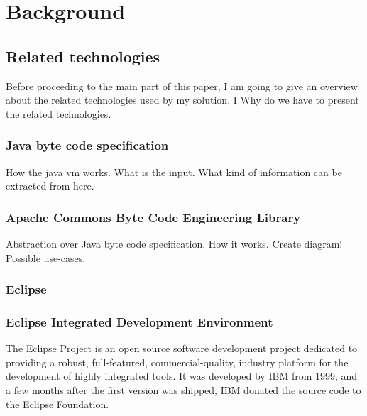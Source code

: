 \chapter{Background}

\section{Related technologies}
Before proceeding to the main part of this paper, I am going to give an overview
about the related technologies used by my solution. I Why do we have to present
the related technologies.


\subsection{Java byte code specification}
How the java vm works.
What is the input.
What kind of information can be extracted from here.


\subsection{Apache Commons Byte Code Engineering Library}
\cite{BCEL}
Abstraction over Java byte code specification. 
How it works. Create diagram!
Possible use-cases.

\subsection{Eclipse}

\subsection{Eclipse Integrated Development Environment}
The Eclipse Project \cite{Eclipseproject} is an open source software development
project dedicated to providing a robust, full-featured, commercial-quality,
industry platform for the development of highly integrated tools. It was
developed by IBM from 1999, and a few months after the first version was
shipped, IBM donated the source code to the Eclipse Foundation.


